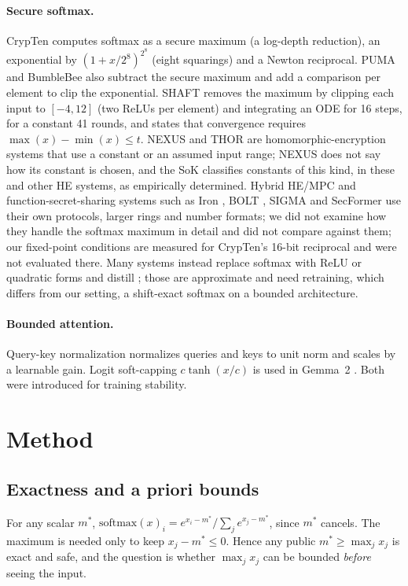 \documentclass[11pt]{article}
\newcommand{\mstar}{m^{*}}
\begin{document}
\paragraph{Secure softmax.}
CrypTen \cite{crypten_2021} computes softmax as a secure maximum (a log-depth reduction),
an exponential by $(1+x/2^8)^{2^8}$ (eight squarings) and a Newton reciprocal. PUMA
\cite{puma_2023} and BumbleBee \cite{bumblebee_2025} also subtract the secure maximum and add a
comparison per element to clip the exponential. SHAFT \cite{shaft_2025} removes the maximum by
clipping each input to $[-4,12]$ (two ReLUs per element) and integrating an ODE for 16 steps,
for a constant 41 rounds, and states that convergence requires $\max(x)-\min(x)\le t$.
NEXUS \cite{nexus_2025} and THOR \cite{thor_2025} are homomorphic-encryption systems that use a
constant or an assumed input range; NEXUS does not say how its constant is chosen, and the SoK \cite{sok_2026}
classifies constants of this kind, in these and other HE systems, as empirically determined. Hybrid HE/MPC and function-secret-sharing systems such as Iron \cite{iron_2022}, BOLT \cite{bolt_2024}, SIGMA \cite{sigma_2024} and SecFormer \cite{secformer_2024} use their own protocols, larger rings and number formats; we did not examine how they handle the softmax maximum in detail and did not compare against them; our fixed-point conditions are measured for CrypTen's 16-bit reciprocal and were not evaluated there. Many systems instead replace softmax with ReLU or quadratic forms and
distill \cite{mpcformer_2023,nimbus_2024}; those are approximate and need retraining,
which differs from our setting, a shift-exact softmax on a bounded architecture.

\paragraph{Bounded attention.}
Query-key normalization \cite{henry_qknorm_2020} normalizes queries and keys to unit norm and
scales by a learnable gain.
Logit soft-capping $c\tanh(x/c)$ is used in Gemma~2 \cite{gemma2_2024}. Both were introduced
for training stability.

\section{Method}\label{sec:method}
\subsection{Exactness and a priori bounds}
For any scalar $\mstar$,
$\mathrm{softmax}(x)_i=e^{x_i-\mstar}/\sum_j e^{x_j-\mstar}$, since $\mstar$ cancels. The
maximum is needed only to keep $x_j-\mstar\le 0$. Hence any public $\mstar\ge\max_j x_j$ is exact and
safe, and the question is whether $\max_j x_j$ can be bounded \emph{before} seeing the input.
\end{document}
